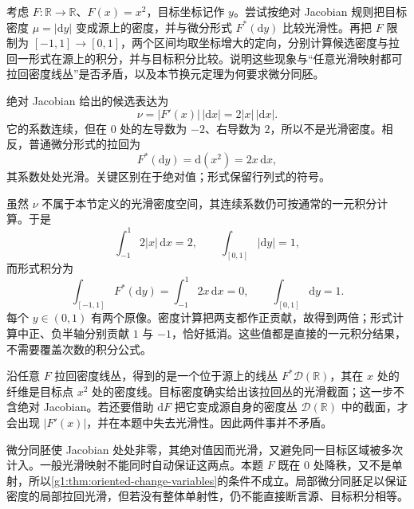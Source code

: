 \begin{exercise}\label{g1:ex:density-critical-map}
	考虑 \(F:\mathbb R\to\mathbb R\)、\(F(x)=x^2\)，目标坐标记作 \(y\)。尝试按绝对 Jacobian 规则把目标密度 \(\mu=|\mathrm{d}y|\) 变成源上的密度，并与微分形式 \(F^*(\mathrm{d}y)\) 比较光滑性。再把 \(F\) 限制为 \([-1,1]\to[0,1]\)，两个区间均取坐标增大的定向，分别计算候选密度与拉回一形式在源上的积分，并与目标积分比较。说明这些现象与“任意光滑映射都可拉回密度线丛”是否矛盾，以及本节换元定理为何要求微分同胚。
\end{exercise}
\begin{solution}
	绝对 Jacobian 给出的候选表达为
	\[
		\nu=|F'(x)|\,|\mathrm{d}x|=2|x|\,|\mathrm{d}x|.
	\]
	它的系数连续，但在 \(0\) 处的左导数为 \(-2\)、右导数为 \(2\)，所以不是光滑密度。相反，普通微分形式的拉回为
	\[
		F^*(\mathrm{d}y)=\mathrm{d}(x^2)=2x\,\mathrm{d}x,
	\]
	其系数处处光滑。关键区别在于绝对值；形式保留行列式的符号。

	虽然 \(\nu\) 不属于本节定义的光滑密度空间，其连续系数仍可按通常的一元积分计算。于是
	\[
		\int_{-1}^1 2|x|\,\mathrm{d}x=2,
		\qquad \int_{[0,1]}|\mathrm{d}y|=1,
	\]
	而形式积分为
	\[
		\int_{[-1,1]}F^*(\mathrm{d}y)=\int_{-1}^1 2x\,\mathrm{d}x=0,
		\qquad \int_{[0,1]}\mathrm{d}y=1.
	\]
	每个 \(y\in(0,1)\) 有两个原像。密度计算把两支都作正贡献，故得到两倍；形式计算中正、负半轴分别贡献 \(1\) 与 \(-1\)，恰好抵消。这些值都是直接的一元积分结果，不需要覆盖次数的积分公式。

	沿任意 \(F\) 拉回密度线丛，得到的是一个位于源上的线丛 \(F^*\mathcal D(\mathbb R)\)，其在 \(x\) 处的纤维是目标点 \(x^2\) 处的密度线。目标密度确实给出该拉回丛的光滑截面；这一步不含绝对 Jacobian。若还要借助 \(\mathrm{d}F\) 把它变成源自身的密度丛 \(\mathcal D(\mathbb R)\) 中的截面，才会出现 \(|F'(x)|\)，并在本题中失去光滑性。因此两件事并不矛盾。

	微分同胚使 Jacobian 处处非零，其绝对值因而光滑，又避免同一目标区域被多次计入。一般光滑映射不能同时自动保证这两点。本题 \(F\) 既在 \(0\) 处降秩，又不是单射，所以\cref{g1:thm:oriented-change-variables}的条件不成立。局部微分同胚足以保证密度的局部拉回光滑，但若没有整体单射性，仍不能直接断言源、目标积分相等。
\end{solution}

